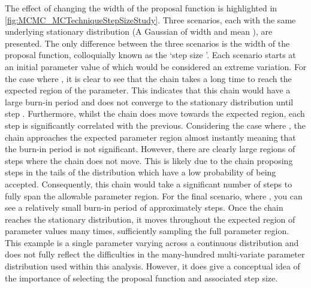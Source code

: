 The effect of changing the width of the proposal function is highlighted in \autoref{fig:MCMC_MCTechniqueStepSizeStudy}. Three scenarios, each with the same underlying stationary distribution (A Gaussian of width  and mean ), are presented. The only difference between the three scenarios is the width of the proposal function, colloquially known as the `step size \quickmath{\sigma}'. Each scenario starts at an initial parameter value of  which would be considered an extreme variation. For the case where , it is clear to see that the chain takes a long time to reach the expected region of the parameter. This indicates that this chain would have a large burn-in period and does not converge to the stationary distribution until step . Furthermore, whilst the chain does move towards the expected region, each step is significantly correlated with the previous. Considering the case where , the chain approaches the expected parameter region almost instantly meaning that the burn-in period is not significant. However, there are clearly large regions of steps where the chain does not move. This is likely due to the chain proposing steps in the tails of the distribution which have a low probability of being accepted. Consequently, this chain would take a significant number of steps to fully span the allowable parameter region. For the final scenario, where , you can see a relatively small burn-in period of approximately  steps. Once the chain reaches the stationary distribution, it moves throughout the expected region of parameter values many times, sufficiently sampling the full parameter region. This example is a single parameter varying across a continuous distribution and does not fully reflect the difficulties in the many-hundred multi-variate parameter distribution used within this analysis. However, it does give a conceptual idea of the importance of selecting the proposal function and associated step size. 

